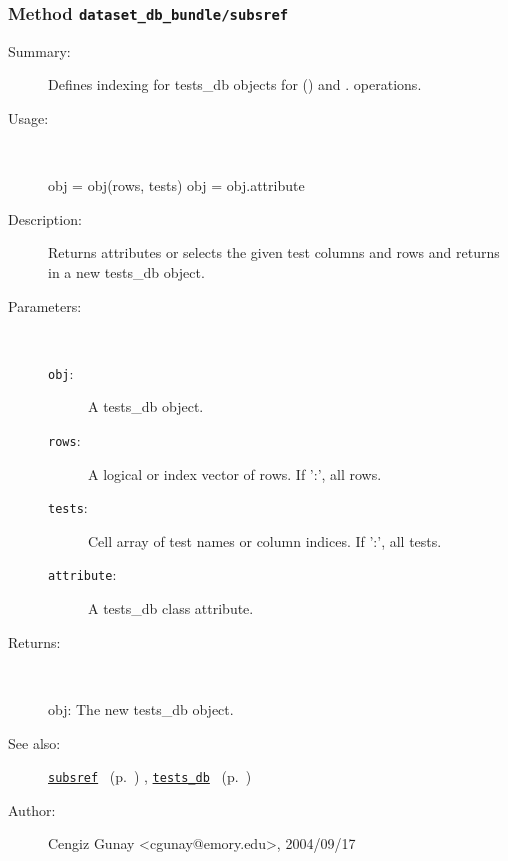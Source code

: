 \subsubsection[Method \texttt{subsref}]{Method \texttt{dataset\_db\_bundle/subsref}}%
%
\label{ref_dataset_db_bundle__subsref}%
\hypertarget{ref_dataset_db_bundle__subsref}{}%
\begin{description}
\item[Summary:]Defines indexing for tests\_db objects for () and . operations. 
%
\item[Usage:]~%
\begin{lyxcode}%
obj = obj(rows, tests)
 obj = obj.attribute
%
\end{lyxcode}%
%
\item[Description:]%
Returns attributes or selects the given test columns and rows
 and returns in a new tests\_db object.
\item[Parameters:]~
\begin{description}%
\item[\texttt{obj}:]
 A tests\_db object.
\item[\texttt{rows}:]
 A logical or index vector of rows. If ':', all rows.
\item[\texttt{tests}:]
 Cell array of test names or column indices. If ':', all tests.
\item[\texttt{attribute}:]
 A tests\_db class attribute.
\end{description}%
%
\item[Returns:]~

	obj: The new tests\_db object.
%
%
\item[See also:]%
\hyperlink{ref_subsref}{\texttt{subsref}}%
\ (p.~\pageref{ref_subsref})%
%
, \hyperlink{ref_tests_db}{\texttt{tests\_db}}%
\ (p.~\pageref{ref_tests_db})%
%
%
\item[Author:]%
Cengiz Gunay <cgunay@emory.edu>, 2004/09/17%
\end{description}
\methodline%
